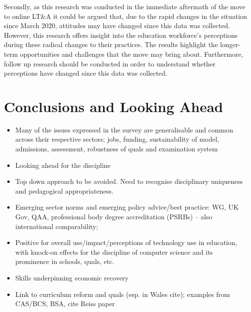 \documentclass[sigconf]{acmart}
\begin{document}
Secondly, as this research was conducted in the immediate aftermath of
the move to online LT\&A it could be argued that, due to the rapid
changes in the situation since March 2020, attitudes may have changed
since this data was collected. However, this research offers insight
into the education workforce’s perceptions during these radical
changes to their practices. The results highlight the longer-term
opportunities and challenges that the move may bring
about. Furthermore, follow up research should be conducted in order to
understand whether perceptions have changed since this data was
collected.

\section{Conclusions and Looking Ahead}\label{conclusions}

\begin{itemize}
\item Many of the issues expressed in the survey are generalisable and
common across their respective sectors; jobs, funding, sustainability
of model, admissions, assessment, robustness of quals and examination
system
\item Looking ahead for the discipline
\item Top down approach to be avoided. Need to recognise disciplinary
uniqueness and pedagogical appropriateness.
\item Emerging sector norms and emerging policy advice/best practice:
WG, UK Gov, QAA, professional body degree accreditation (PSRBs) – also
international comparability;
\item Positive for overall use/impact/perceptions of technology use in
education, with knock-on effects for the discipline of computer
science and its prominence in schools, quals, etc.
\item Skills underpinning economic recovery
  \item Link to curriculum reform and quals (esp. in Wales cite);
examples from CAS/BCS, BSA, cite Reiss paper
  \end{itemize}

\end{document}
